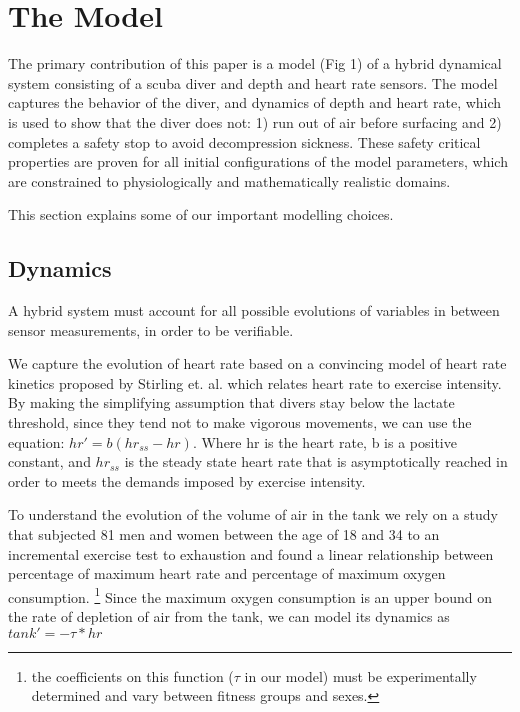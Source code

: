 \documentclass[sigconf,screen]{acmart}
\newcommand{\varheart}{hr}
\begin{document}

\section{The Model}
The primary contribution of this paper is a model (Fig 1) of a hybrid dynamical system consisting of a scuba diver and depth and heart rate sensors. The model captures the behavior of the diver, and dynamics of depth and heart rate, which is used to show that the diver does not: 1) run out of air before surfacing and 2) completes a safety stop to avoid decompression sickness. These safety critical properties are proven for all initial configurations of the model parameters, which are constrained to physiologically and mathematically realistic domains.

This section explains some of our important 
modelling choices.

\subsection{Dynamics}
A hybrid system must account for all possible evolutions of variables in between sensor measurements, in order to be verifiable. 

We capture the evolution of heart rate based on a convincing model of heart rate kinetics proposed by Stirling et. al. which relates heart rate to exercise intensity. By making the simplifying assumption that divers stay below the lactate threshold, since they tend not to make vigorous movements, we can use the equation:
$hr' = b(hr_{ss} - hr)$. Where hr is the heart rate, b is a positive constant, and $hr_{ss}$ is the steady state heart rate that is asymptotically reached in order to meets the demands imposed by exercise intensity.

To understand the evolution of the volume of air in the tank we rely on a study that subjected 81 men and women between the age of 18 and 34 to an incremental exercise test to exhaustion and found a linear relationship between percentage of maximum heart rate and percentage of maximum oxygen consumption. \footnote[2]{the coefficients on this function ($\tau$ in our model) must be experimentally determined and vary between fitness groups and sexes.} Since the maximum oxygen consumption is an upper bound on the rate of depletion of air from the tank, we can model its dynamics as $tank' = - \tau * \varheart$
\end{document}
